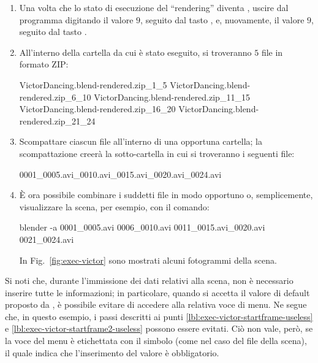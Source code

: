 \begin{enumerate}
\begin{figure}
\caption{Monitor dello stato di esecuzione del ``rendering'' di ogni gruppo di ``frame''.}
\label{fig:monitor-victor}
\end{figure}
\item Una volta che lo stato di esecuzione del ``rendering'' diventa , uscire dal programma digitando il valore $9$, seguito dal tasto , e, nuovamente, il valore $9$, seguito dal tasto .
\item All'interno della cartella da cui \mgTheApp{} \`e stato eseguito, si troveranno $5$ file in formato ZIP:
\begin{mgCodeBox}
\small
VictorDancing.blend-rendered.zip\_1\_5\newline
VictorDancing.blend-rendered.zip\_6\_10\newline
VictorDancing.blend-rendered.zip\_11\_15\newline
VictorDancing.blend-rendered.zip\_16\_20\newline
VictorDancing.blend-rendered.zip\_21\_24
\end{mgCodeBox}
\item Scompattare ciascun file all'interno di una opportuna cartella; la scompattazione creer\`a la sotto-cartella  in cui si troveranno i seguenti file:
\begin{mgCodeBox}
\small
0001\_0005.avi\_0010.avi\_0015.avi\_0020.avi\_0024.avi
\end{mgCodeBox}
\item \`E ora possibile combinare i suddetti file in modo opportuno o, semplicemente, visualizzare la scena, per esempio, con il comando:
\begin{mgCodeBox}
\small
blender -a 0001\_0005.avi 0006\_0010.avi 0011\_0015.avi\_0020.avi 0021\_0024.avi
\end{mgCodeBox}
In Fig.~\ref{fig:exec-victor} sono mostrati alcuni fotogrammi della scena.
\end{enumerate}
Si noti che, durante l'immissione dei dati relativi alla scena, non \`e necessario inserire tutte le informazioni; in particolare, quando si accetta il valore di default proposto da \mgTheApp{} , \`e possibile evitare di accedere alla relativa voce di menu.
Ne segue che, in questo esempio, i passi descritti ai punti \ref{lbl:exec-victor-startframe-useless} e \ref{lbl:exec-victor-startframe2-useless} possono essere evitati.
Ci\`o non vale, per\`o, se la voce del menu \`e etichettata con il simbolo \mgCode{[*]} (come nel caso del file della scena), il quale indica che l'inserimento del valore \`e obbligatorio.

